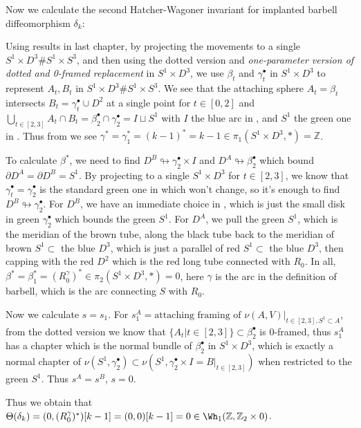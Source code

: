 \begin{example} \label{eg:calculation-for-delta_k}
    Now we calculate the second Hatcher-Wagoner invariant for implanted barbell diffeomorphism $\delta_k$: 
    
    Using results in last chapter, by projecting the movements to a single $S^1\times D^3\# S^1\times S^3$, and then using the dotted version and \emph{one-parameter version of dotted and 0-framed replacement} in $S^1\times D^3$, we use $\beta_t$ and $\gamma_t^\bullet$ in $S^1\times D^3$ to represent $A_t, B_t$ in $S^1\times D^3\# S^1\times S^3$. We see that the attaching sphere $A_t=\beta_t$ intersects $B_t=\gamma_t^\bullet\cup D^2$ at a single point for $t\in[0,2]$ and $\bigcup _{t\in[2,3]} A_t\cap B_t=\beta_2^\bullet \cap \gamma_2^\bullet=I\sqcup S^1$ with $I$ the blue arc in , and $S^1$ the green one in . Thus from  we see $\gamma^*=\gamma_1^*=(k-1)^*=k-1\in \pi_1(S^1\times D^3, *)=\mathbb{Z}$. 

    To calculate $\beta^*$, we need to find $D^B\looparrowright \gamma_2^\bullet \times I $ and $D^A\looparrowright \beta_2^\bullet $ which bound $\partial D^A=\partial D^B=S^1$. By projecting to a single $S^1\times D^3$ for $t\in[2,3]$, we know that $\gamma_t^\bullet=\gamma_2^\bullet$ is the standard green one in  which won't change, so it's enough to find $D^B\looparrowright \gamma_2^\bullet $. For $D^B$, we have an immediate choice in , which is just the small disk in green $\gamma_2^\bullet$ which bounds the green $S^1$. For $D^A$, we pull the green $S^1$, which is the meridian of the brown tube, along the black tube back to the meridian of brown $S^1\subset $ the blue $D^3$, which is just a parallel of red $S^1\subset$ the blue $D^3$, then capping with the red $D^2$ which is the red long tube connected with $R_0$. In all, $\beta^*=\beta_1^*=(R_0^\gamma)^*\in \pi_2(S^1\times D^3, *)=0$, here $\gamma$ is the arc in the definition of barbell, which is the arc connecting $S$ with $R_0$.

    Now we calculate $s=s_1$. For $s_1^A=\text{attaching framing of }\nu (A, V)|_{t\in [2,3], S^1\subset A}$, from the dotted version we know that $\{A_t|t\in [2,3]\}\subset \beta_2^\bullet$ is 0-framed, thus $s_1^A$ has a chapter which is the normal bundle of $\beta_2^\bullet$ in $S^1\times D^3$, which is exactly a normal chapter of $\nu (S^1, \gamma_2^\bullet)\subset \nu (S^1, \gamma_2^\bullet \times I=B|_{t\in [2,3]})$ when restricted to the green $S^1$. Thus $s^A=s^B$, $s=0$.

    Thus we obtain that $\Theta(\delta_k)=(0, (R_0^\gamma)^*)[k-1]=(0,0)[k-1]=0\in \Wh_1(\mathbb{Z}, \mathbb{Z}_2\times 0)$.    
\end{example}

